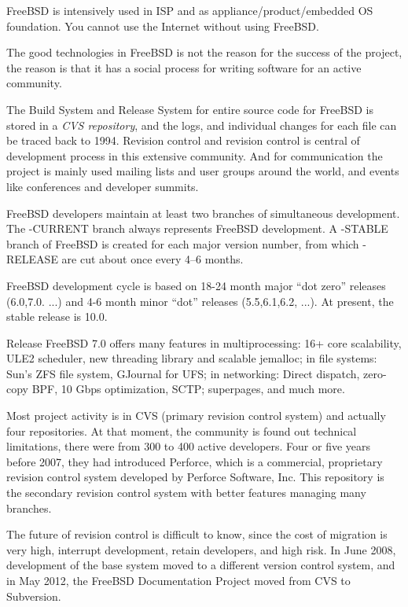 \documentclass[11pt]{article}
\begin{document}
FreeBSD is intensively used in ISP and as appliance/product/embedded OS foundation. You cannot use the Internet without using FreeBSD.

The good technologies in FreeBSD is not the reason for the success of the project, the reason is that it has a social process for writing software for an active community. 

The Build System and Release System for entire source code for FreeBSD is stored in a \emph{CVS repository}, and the logs, and individual changes for each file can be traced back to 1994. Revision control and revision control is central of development process in this extensive community. And for communication the project is mainly used mailing lists and user groups around the world, and events like conferences and developer summits.

FreeBSD developers maintain at least two branches of simultaneous development. The -CURRENT branch always represents FreeBSD development. A -STABLE branch of FreeBSD is created for each major version number, from which -RELEASE are cut about once every 4–6 months. 

FreeBSD development cycle is based on 18-24 month major ``dot zero'' releases (6.0,7.0. ...) and 4-6 month minor ``dot'' releases (5.5,6.1,6.2, ...). At present, the stable release is 10.0.

Release FreeBSD 7.0 offers many features in multiprocessing: 16+ core scalability, ULE2 scheduler, new threading library and scalable jemalloc; in file systems: Sun's ZFS file system, GJournal for UFS; in networking: Direct dispatch, zero-copy BPF, 10 Gbps optimization, SCTP; superpages, and much more.

Most project activity is in CVS (primary revision control system) and actually four repositories. At that moment, the community is found out technical limitations, there were from 300 to 400 active developers. Four or five years before 2007, they had introduced Perforce, which  is a commercial, proprietary revision control system developed by Perforce Software, Inc. This repository is the secondary revision control system with better features managing many branches.

The future of revision control is difficult to know, since the cost of migration is very high, interrupt development, retain developers, and high risk. In June 2008, development of the base system moved to a different version control system, and in May 2012, the FreeBSD Documentation Project moved from CVS to Subversion. 
\end{document}
